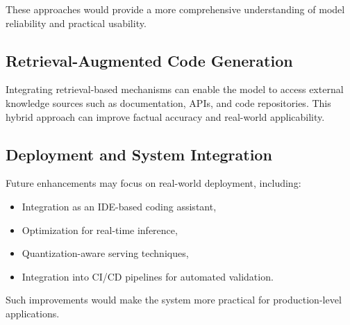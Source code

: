 These approaches would provide a more comprehensive understanding of model reliability and practical usability.

\subsection{Retrieval-Augmented Code Generation}

Integrating retrieval-based mechanisms can enable the model to access external knowledge sources such as documentation, APIs, and code repositories. This hybrid approach can improve factual accuracy and real-world applicability.

\subsection{Deployment and System Integration}

Future enhancements may focus on real-world deployment, including:
\begin{itemize}
    \item Integration as an IDE-based coding assistant,
    \item Optimization for real-time inference,
    \item Quantization-aware serving techniques,
    \item Integration into CI/CD pipelines for automated validation.
\end{itemize}

Such improvements would make the system more practical for production-level applications.